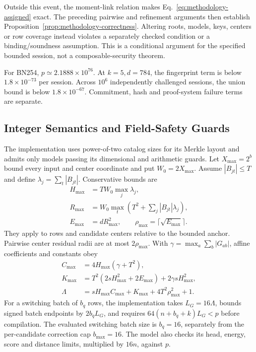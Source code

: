 Outside this event, the moment-link relation makes
Eq.~\eqref{eq:methodology-assigned} exact. The preceding pairwise and
refinement arguments then establish
Proposition~\ref{prop:methodology-correctness}. Altering roots, models, keys,
centers or row coverage instead violates a separately checked condition or
a binding/soundness assumption. This is a conditional argument for the
specified bounded session, not a composable-security theorem.

For BN254, $p\simeq2.1888\times10^{76}$. At $k=5,d=784$, the fingerprint
term is below $1.8\times10^{-73}$ per session. Across $10^6$ independently
challenged sessions, the union bound is below $1.8\times10^{-67}$.
Commitment, hash and proof-system failure terms are separate.

\subsection{Integer Semantics and Field-Safety Guards}
The implementation uses power-of-two catalog sizes for its Merkle layout
and admits only models passing its dimensional and arithmetic guards.
Let $X_{\max}=2^b$ bound every input and center coordinate and put
$W_0=2X_{\max}$. Assume $|B_{jt}|\leq T$ and define
$\lambda_j=\sum_t|B_{jt}|$. Conservative bounds are
\begin{align}
 H_{\max}&=TW_0\max_j\lambda_j,\nonumber\\
 R_{\max}&=W_0\max_t\left(T^2+\sum_j|B_{jt}|\lambda_j\right),\nonumber\\
 E_{\max}&=dR_{\max}^2,\qquad
 \rho_{\max}=\lceil\sqrt{E_{\max}}\rceil.
\end{align}
They apply to rows and candidate centers relative to the bounded anchor.
Pairwise center residual radii are at most $2\rho_{\max}$. With
$\gamma=\max_a\sum_b|G_{ab}|$, affine coefficients and constants obey
\begin{align}
 C_{\max}&=4H_{\max}(\gamma+T^2),\nonumber\\
 K_{\max}&=T^2(2sH_{\max}^2+2E_{\max})
                    +2\gamma sH_{\max}^2,\nonumber\\
 \Lambda&=sH_{\max}C_{\max}+K_{\max}
                      +4T^2\rho_{\max}^2+1.
\end{align}
For a switching batch of $b_q$ rows, the implementation takes
$L_G=16\Lambda$, bounds signed batch endpoints by $2b_qL_G$, and requires
$64(n+b_q+k)L_G<p$ before compilation. The evaluated switching batch size
is $b_q=16$, separately from the per-candidate correction cap
$b_{\max}=16$. The model also checks its head, energy, score and distance
limits, multiplied by $16n$, against $p$.

